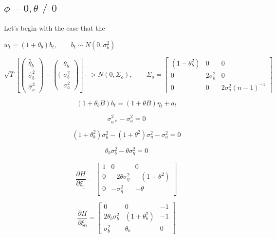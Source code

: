 \subsection{$\phi = 0, \theta \neq 0$}

Let's begin with the case that the 

$w_t = (1 + \theta_b)b_t, \qquad b_t \sim N(0,\sigma_b^2)$

$$\sqrt{T}\left[\left(\begin{array}{c}
     \hat{\theta}_b \\
      \hat{\sigma}_b^2 \\
      \hat{\sigma}_a^2
\end{array}\right) - \left((\begin{array}{c}
    {\theta}_b \\
      {\sigma}_b^2 \\
     {\sigma}_a^2
\end{array}\right) \right] -> N(0,\Sigma_o),\qquad \Sigma_o = \left[\begin{array}{ccc}
    (1-\theta_b^2) & 0 & 0 \\
    0 & 2\sigma_b^2 & 0 \\
    0 & 0 & 2\sigma_a^2(n-1)^{-1}
\end{array}\right]$$

$$ (1 + \theta_bB)b_t = (1 + \theta B) \eta_t + a_t $$

$$\sigma_{a*}^2 - \sigma_a^2 = 0$$

$$ (1 + \theta_b^2)\sigma_b^2 - (1 + \theta^2)\sigma_\eta^2 - \sigma_a^2 = 0$$

$$ \theta_b\sigma_b^2 - \theta\sigma_\eta^2 = 0 $$

$$ \frac{\partial H}{\partial \xi_1} = \left[\begin{array}{ccc}
    1 & 0 & 0 \\
    0 & -2\theta\sigma_\eta^2 & -(1 + \theta^2) \\
    0 & -\sigma_\eta^2 & -\theta
\end{array}\right] $$

$$ \frac{\partial H}{\partial \xi_0} = \left[\begin{array}{ccc}
    0 & 0 & -1 \\
    2\theta_b\sigma_b^2 & (1 + \theta_b^2) & -1 \\
    \sigma_b^2 & \theta_b & 0
\end{array}\right] $$






